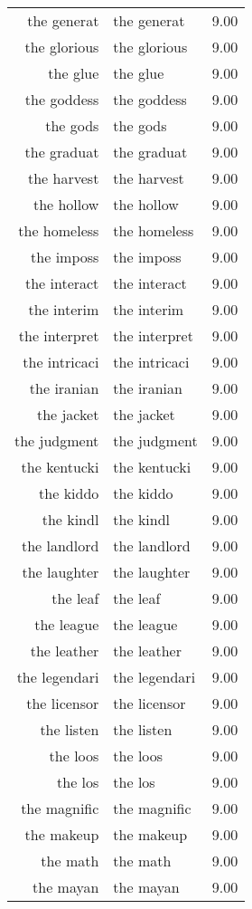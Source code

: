 \begin{table}[ht]
\begin{tabular}{rlr}
  the generat & the generat & 9.00 \\ 
  the glorious & the glorious & 9.00 \\ 
  the glue & the glue & 9.00 \\ 
  the goddess & the goddess & 9.00 \\ 
  the gods & the gods & 9.00 \\ 
  the graduat & the graduat & 9.00 \\ 
  the harvest & the harvest & 9.00 \\ 
  the hollow & the hollow & 9.00 \\ 
  the homeless & the homeless & 9.00 \\ 
  the imposs & the imposs & 9.00 \\ 
  the interact & the interact & 9.00 \\ 
  the interim & the interim & 9.00 \\ 
  the interpret & the interpret & 9.00 \\ 
  the intricaci & the intricaci & 9.00 \\ 
  the iranian & the iranian & 9.00 \\ 
  the jacket & the jacket & 9.00 \\ 
  the judgment & the judgment & 9.00 \\ 
  the kentucki & the kentucki & 9.00 \\ 
  the kiddo & the kiddo & 9.00 \\ 
  the kindl & the kindl & 9.00 \\ 
  the landlord & the landlord & 9.00 \\ 
  the laughter & the laughter & 9.00 \\ 
  the leaf & the leaf & 9.00 \\ 
  the league & the league & 9.00 \\ 
  the leather & the leather & 9.00 \\ 
  the legendari & the legendari & 9.00 \\ 
  the licensor & the licensor & 9.00 \\ 
  the listen & the listen & 9.00 \\ 
  the loos & the loos & 9.00 \\ 
  the los & the los & 9.00 \\ 
  the magnific & the magnific & 9.00 \\ 
  the makeup & the makeup & 9.00 \\ 
  the math & the math & 9.00 \\ 
  the mayan & the mayan & 9.00 \\ 

\end{tabular}
\end{table}
